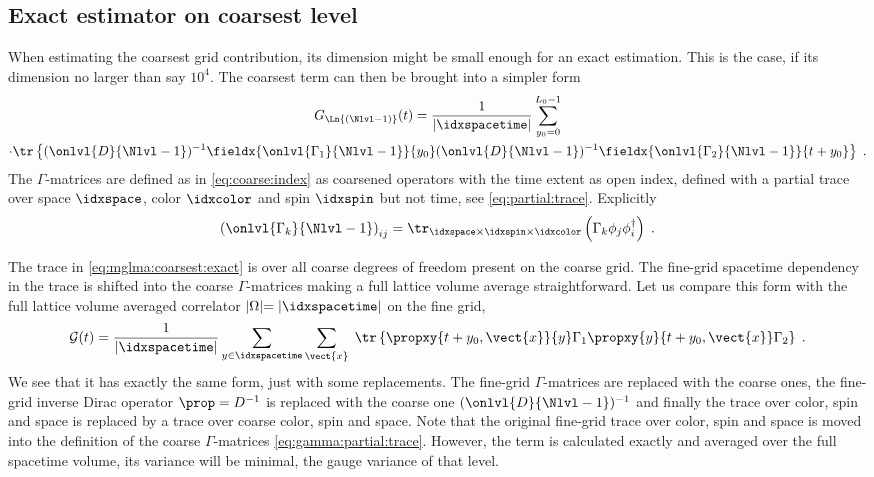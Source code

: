 \subsection{Exact estimator on coarsest level}
\label{sec:mglma:coarsest:exact}

When estimating the coarsest grid contribution, its dimension might be small enough for an exact estimation.
This is the case, if its dimension no larger than say $10^{4}$.
The coarsest term can then be brought into a simpler form
\begin{multline} \label{eq:mglma:coarsest:exact}
G_{\Ln{(\Nlvl-1)}}(t)
= \frac{1}{\lvert \idxspacetime \rvert} \sum_{y_0=0}^{L_0-1} \\
\cdot \tr \left\{
  (\onlvl{D}{\Nlvl-1})^{-1}
  \fieldx{\onlvl{\Gamma_1}{\Nlvl-1}}{y_0}
  (\onlvl{D}{\Nlvl-1})^{-1}
  \fieldx{\onlvl{\Gamma_2}{\Nlvl-1}}{t+y_0}
\right\} \;.
\end{multline}
The $\Gamma$-matrices are defined as in \cref{eq:coarse:index} as coarsened operators with the time extent as open index, \ie defined with a partial trace over space $\idxspace$, color $\idxcolor$ and spin $\idxspin$ but not time, see \cref{eq:partial:trace}.
Explicitly
\begin{equation} \label{eq:gamma:partial:trace}
\left( \onlvl{\Gamma_k}{\Nlvl-1} \right)_{ij} = \tr_{\idxspace \times \idxspin \times \idxcolor} \left( \Gamma_k \phi_j \phi_i^\dagger \right) \;.
\end{equation}

The trace in \cref{eq:mglma:coarsest:exact} is over all coarse degrees of freedom present on the coarse grid.
The fine-grid spacetime dependency in the trace is shifted into the coarse $\Gamma$-matrices making a full lattice volume average straightforward.
Let us compare this form with the full lattice volume averaged correlator $\lvert \Omega \lvert = \lvert \idxspacetime \lvert$ on the fine grid,
\begin{equation} \label{eq:G:corr:volume:averaged}
\mathcal{G}(t) =
\frac{1}{\lvert \idxspacetime \rvert}
\sum_{y \in \idxspacetime}
\sum_{\vect{x}} \;
\tr \left\{
  \propxy{t+y_0, \vect{x}}{y} \Gamma_1 \propxy{y}{t+y_0, \vect{x}} \Gamma_2
\right\} \;.
\end{equation}
We see that it has exactly the same form, just with some replacements.
The fine-grid $\Gamma$-matrices are replaced with the coarse ones, the fine-grid inverse Dirac operator $\prop=D^{-1}$ is replaced with the coarse one $(\onlvl{D}{\Nlvl-1})^{-1}$ and finally the trace over color, spin and space is replaced by a trace over coarse color, spin and space.
Note that the original fine-grid trace over color, spin and space is moved into the definition of the coarse $\Gamma$-matrices \cref{eq:gamma:partial:trace}.
However, the term is calculated exactly and averaged over the full spacetime volume, its variance will be minimal, \ie the gauge variance of that level.

